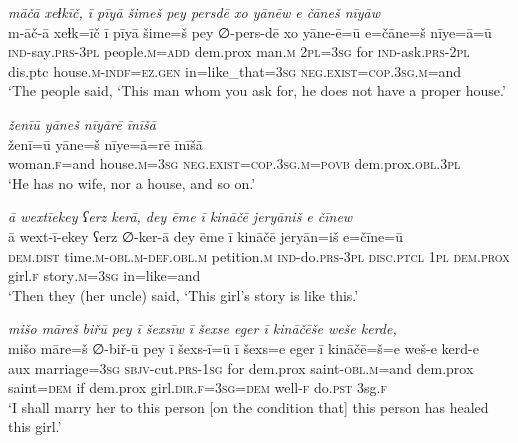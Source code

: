 \ea \label{ZP.86}
\textit{māčā xeɫkīč, ī pīyā šimeš pey persdē xo yānēw e čāneš nīyāw} \\ 
\gll m-āč-ā xeɫk=īč ī pīyā šime=š pey ∅-pers-dē xo yāne-ē=ū e=čāne=š nīye=ā=ū \\ 
 \textsc{ind-}say\textsc{.prs}\textsc{-3pl} people\textsc{.m}\textsc{=add} dem.prox man\textsc{.m} \textsc{2pl}\textsc{=3sg} for \textsc{ind-}ask\textsc{.prs}-\textsc{2pl} dis.ptc house\textsc{.m}\textsc{-indf}\textsc{\textsc{=ez.gen}} in=like\_that\textsc{=3sg} \textsc{\textsc{neg.}exist}\textsc{=cop}\textsc{.3sg}\textsc{.m}=and \\ 
\glt `The people said, ‘This man whom you ask for, he does not have a proper house.'
\z 
 
\ea \label{ZP.87}
\textit{ženīū yāneš nīyārē īnīšā} \\ 
\gll ženī=ū yāne=š nīye=ā=rē īnīšā \\ 
 woman\textsc{.f}=and house\textsc{.m}\textsc{=3sg} \textsc{\textsc{neg.}exist}\textsc{=cop}\textsc{.3sg}\textsc{.m}\textsc{=\textsc{povb}} dem.prox\textsc{.obl}\textsc{.3pl} \\ 
\glt `He has no wife, nor a house, and so on.'
\z 
 
\ea \label{ZP.88}
\textit{ā wextīekey ʕerz kerā, dey ēme ī kināčē jeryāniš e čīnew} \\ 
\gll ā wext-ī-ekey ʕerz ∅-ker-ā dey ēme ī kināčē jeryān=iš e=čīne=ū \\ 
 \textsc{dem.dist} time\textsc{.m}\textsc{-obl}\textsc{.m}\textsc{-def}\textsc{.obl}\textsc{.m} petition\textsc{.m} \textsc{ind-}do\textsc{.prs}\textsc{-3pl} \textsc{disc.ptcl} \textsc{1pl} \textsc{dem.prox} girl\textsc{.f} story\textsc{.m}\textsc{=3sg} in=like=and \\ 
\glt `Then they (her uncle) said, ‘This girl’s story is like this.'
\z 
 
\ea \label{ZP.90}
\textit{mišo māreš biřū pey ī šexsīw ī šexse eger ī kināčēše weše kerde,} \\ 
\gll mišo māre=š ∅-biř-ū pey ī šexs-ī=ū ī šexs=e eger ī kināčē=š=e weš-e kerd-e \\ 
 aux marriage\textsc{=3sg} \textsc{sbjv-}cut\textsc{.prs}\textsc{-\textsc{1sg}} for dem.prox saint\textsc{-obl}\textsc{.m}=and dem.prox saint\textsc{=dem} if dem.prox girl\textsc{.dir}\textsc{.f}\textsc{=3sg}\textsc{=dem} well\textsc{-f} do\textsc{.pst} 3sg\textsc{.f} \\ 
\glt `I shall marry her to this person [on the condition that] this person has healed this girl.'
\z 
 
